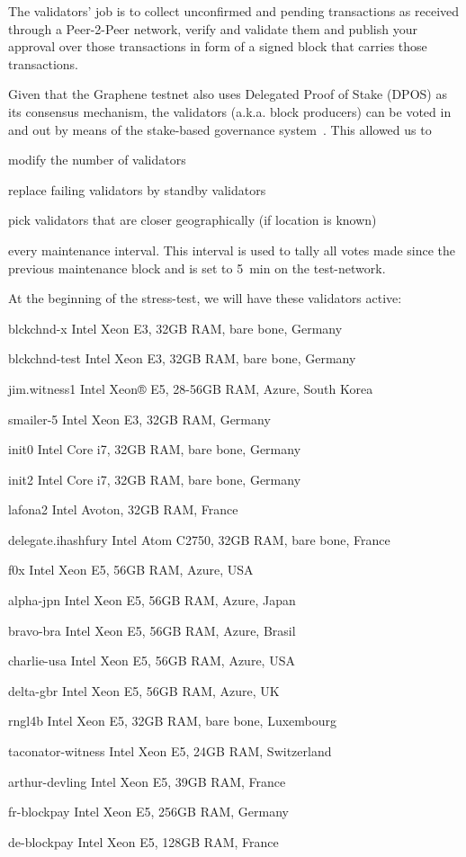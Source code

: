 The validators' job is to collect unconfirmed and pending transactions as
received through a Peer-2-Peer network, verify and validate them and publish
your approval over those transactions in form of a signed block that carries
those transactions.

Given that the Graphene testnet also uses Delegated Proof of Stake (DPOS) as
its consensus mechanism, the validators (a.k.a. block producers) can be voted
in and out by means of the stake-based governance system~\cite{bts:general}.
This allowed us to 
\begin{inparaenum}
 \item modify the number of validators
 \item replace failing validators by standby validators
 \item pick validators that are closer geographically (if location is known)
\end{inparaenum}
every maintenance interval. This interval is used to tally all votes made
since the previous maintenance block and is set to \SI{5}{min} on the
test-network.

At the beginning of the stress-test, we will have these validators active:

\begin{compactdesc}
 \item[blckchnd-x] Intel Xeon E3, 32GB RAM, bare bone, Germany
 \item[blckchnd-test] Intel Xeon E3, 32GB RAM, bare bone, Germany
 \item[jim.witness1] Intel Xeon® E5, 28-56GB RAM, Azure, South Korea
 \item[smailer-5]  Intel Xeon E3, 32GB RAM, Germany
 \item[init0] Intel Core i7, 32GB RAM, bare bone, Germany
 \item[init2] Intel Core i7, 32GB RAM, bare bone, Germany
 \item[lafona2] Intel Avoton, 32GB RAM, France
 \item[delegate.ihashfury] Intel Atom C2750, 32GB RAM, bare bone, France
 \item[f0x] Intel Xeon E5, 56GB RAM, Azure, USA
 \item[alpha-jpn] Intel Xeon E5, 56GB RAM, Azure, Japan
 \item[bravo-bra] Intel Xeon E5, 56GB RAM, Azure, Brasil
 \item[charlie-usa] Intel Xeon E5, 56GB RAM, Azure, USA
 \item[delta-gbr] Intel Xeon E5, 56GB RAM, Azure, UK
 \item[rngl4b] Intel Xeon E5, 32GB RAM, bare bone, Luxembourg
 \item[taconator-witness] Intel Xeon E5, 24GB RAM, Switzerland
 \item[arthur-devling] Intel Xeon E5, 39GB RAM, France
 \item[fr-blockpay] Intel Xeon E5, 256GB RAM, Germany
 \item[de-blockpay] Intel Xeon E5, 128GB RAM, France
\end{compactdesc}
